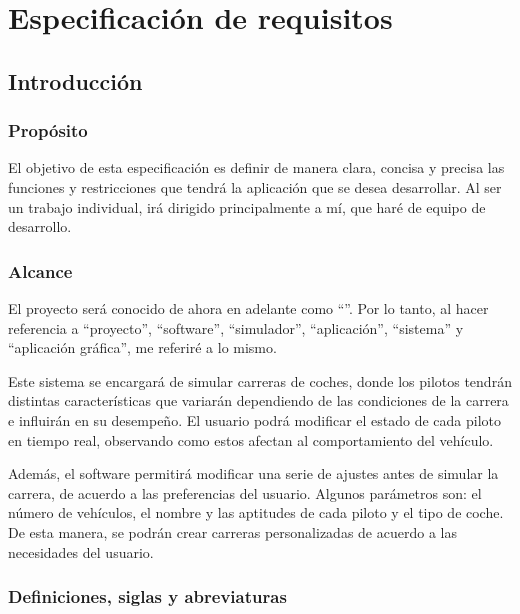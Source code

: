 \chapter{Especificación de requisitos}

\section{Introducción}

\subsection{Propósito}
El objetivo de esta especificación es definir de manera clara, concisa y precisa las funciones y restricciones que tendrá la aplicación que se desea desarrollar. Al ser un trabajo individual, irá dirigido principalmente a mí, que haré de equipo de desarrollo.

\subsection{Alcance}
El proyecto será conocido de ahora en adelante como ``\myTitle''. Por lo tanto, al hacer referencia a ``proyecto'', ``software'', ``simulador'', ``aplicación'', ``sistema'' y ``aplicación gráfica'', me referiré a lo mismo.

\bigskip

Este sistema se encargará de simular carreras de coches, donde los pilotos tendrán distintas características que variarán dependiendo de las condiciones de la carrera e influirán en su desempeño. El usuario podrá modificar el estado de cada piloto en tiempo real, observando como estos afectan al comportamiento del vehículo.

\bigskip

Además, el software permitirá modificar una serie de ajustes antes de simular la carrera, de acuerdo a las preferencias del usuario. Algunos parámetros son: el número de vehículos, el nombre y las aptitudes de cada piloto y el tipo de coche. De esta manera, se podrán crear carreras personalizadas de acuerdo a las necesidades del usuario.

\newpage

\subsection{Definiciones, siglas y abreviaturas}

